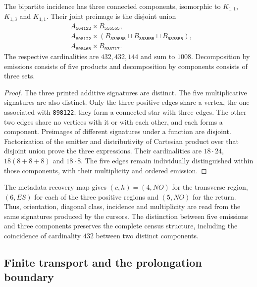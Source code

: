 \begin{theorem}
The bipartite incidence has three connected components, isomorphic to
$K_{1,1}$, $K_{1,3}$ and $K_{1,1}$. Their joint preimage is the disjoint
union
\begin{align*}
 &A_{\texttt{564122}}\times B_{\texttt{555555}},\\
 &A_{\texttt{898122}}\times
  (B_{\texttt{339555}}\sqcup B_{\texttt{393555}}
     \sqcup B_{\texttt{933555}}),\\
 &A_{\texttt{898465}}\times B_{\texttt{933717}}.
\end{align*}
The respective cardinalities are $432,432,144$ and sum to $1008$.
Decomposition by emissions consists of five products and
decomposition by components consists of three sets.
\end{theorem}
\begin{proof}
The three printed additive signatures are distinct. The five multiplicative
signatures are also distinct. Only the three positive edges share
a vertex, the one associated with \texttt{898122}; they form a connected star
with three edges. The other two edges share no vertices with
it or with each other, and each forms a component. Preimages of
different signatures under a function are disjoint. Factorization of the
emitter and distributivity of Cartesian product over that disjoint
union prove the three expressions. Their cardinalities are
$18\cdot24$, $18(8+8+8)$ and $18\cdot8$. The five edges remain
individually distinguished within those components, with their multiplicity and
ordered emission.
\end{proof}

The metadata recovery map gives $(c,h)=(4,NO)$ for the transverse region,
$(6,ES)$ for each of the three positive regions and $(5,NO)$ for the return.
Thus, orientation, diagonal class, incidence and multiplicity are read from
the same signatures produced by the cursors. The distinction between five
emissions and three components preserves the complete census structure,
including the coincidence of cardinality $432$ between two distinct components.

\subsection{Finite transport and the prolongation boundary}

